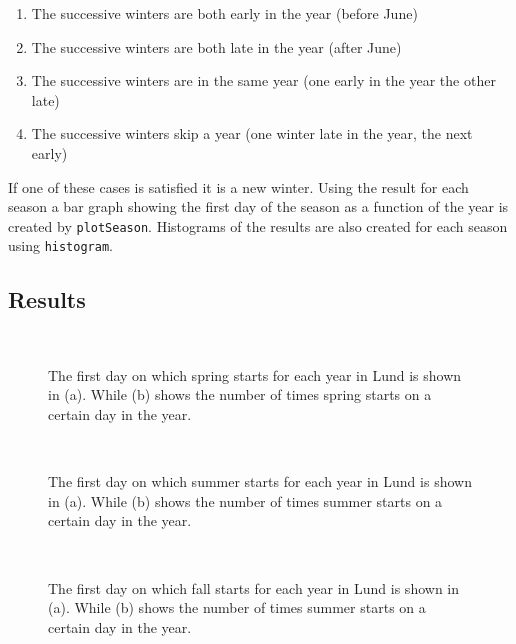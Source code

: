 \begin{enumerate}
\item The successive winters are both early in the year (before June)
\item The successive winters are both late in the year (after June)
\item The successive winters are in the same year (one early in the year the other late)
\item The successive winters skip a year (one winter late in the year, the next early)
\end{enumerate}

If one of these cases is satisfied it is a new winter. Using the result for each season a bar graph showing the first day of the season as a function of the year is created by \texttt{plotSeason}. Histograms of the results are also created for each season using \texttt{histogram}. 

\subsection{Results}

\begin{figure}[ht!]
\centering
{} 
\\
\caption{The first day on which spring starts for each year in Lund is shown in (a).  While (b) shows the number of times spring starts on a certain day in the year.}
\label{fig:spring}
\end{figure}

\begin{figure}[ht!]
\centering
{} 
\\
\caption{The first day on which summer starts for each year in Lund is shown in (a).  While (b) shows the number of times summer starts on a certain day in the year.}
\label{fig:summer}
\end{figure}

\begin{figure}[ht!]
\centering
{} 
\\
\caption{The first day on which fall starts for each year in Lund is shown in (a).  While (b) shows the number of times summer starts on a certain day in the year.}
\label{fig:fall}
\end{figure}

